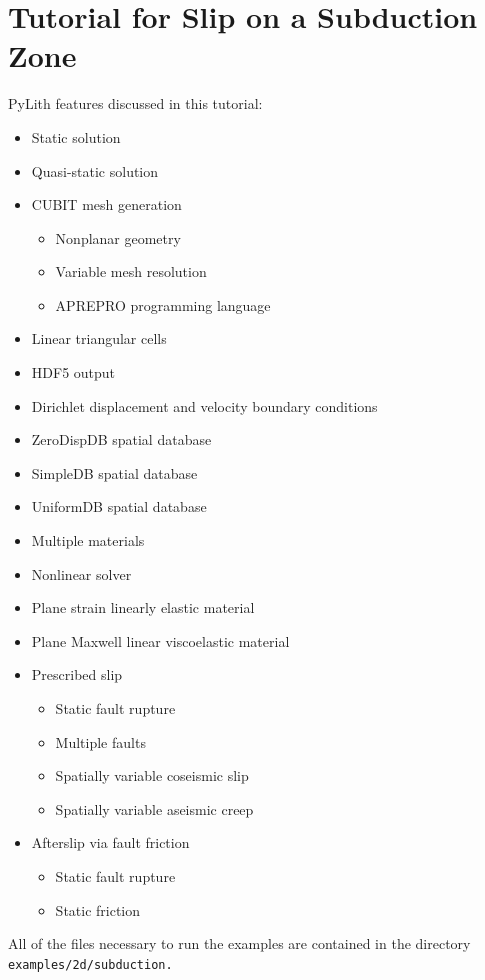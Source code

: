 
\section{\label{sec:Tutorial-Subduction}Tutorial for Slip on a Subduction
Zone}

PyLith features discussed in this tutorial:
\begin{itemize}
\item Static solution
\item Quasi-static solution
\item CUBIT mesh generation

\begin{itemize}
\item Nonplanar geometry
\item Variable mesh resolution
\item APREPRO programming language
\end{itemize}
\item Linear triangular cells
\item HDF5 output
\item Dirichlet displacement and velocity boundary conditions
\item ZeroDispDB spatial database
\item SimpleDB spatial database
\item UniformDB spatial database
\item Multiple materials
\item Nonlinear solver
\item Plane strain linearly elastic material
\item Plane Maxwell linear viscoelastic material
\item Prescribed slip

\begin{itemize}
\item Static fault rupture
\item Multiple faults
\item Spatially variable coseismic slip
\item Spatially variable aseismic creep
\end{itemize}
\item Afterslip via fault friction

\begin{itemize}
\item Static fault rupture
\item Static friction
\end{itemize}
\end{itemize}
All of the files necessary to run the examples are contained in the
directory \texttt{examples/2d/subduction.}


